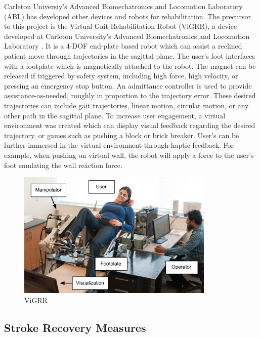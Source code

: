 \documentclass[12pt]{report}
\begin{document}
	Carleton Universiy's Advanced Biomechatronics and Locomotion Laboratory (ABL) has developed other devices and robots for rehabilitation. The precursor to this project is the Virtual Gait Rehabilitation Robot (ViGRR), a device developed at Carleton University's Advanced Biomechatronics and Locomotion Laboratory \cite{Chisholm2014, Chisholm2010}. It is a 4-DOF end-plate based robot which can assist a reclined patient move through trajectories in the sagittal plane. The user's foot interfaces with a footplate which is magnetically attached to the robot. The magnet can be released if triggered by safety system, including high force, high velocity, or pressing an emergency stop button. An admittance controller is used to provide assistance-as-needed, roughly in proportion to the trajectory error. These desired trajectories can include gait trajectories, linear motion, circular motion, or any other path in the sagittal plane. To increase user engagement, a virtual environment was created which can display visual feedback regarding the desired trajectory, or games such as pushing a block or brick breaker. User's can be further immersed in the virtual environment through haptic feedback. For example, when pushing on virtual wall, the robot will apply a force to the user's foot emulating the wall reaction force. 
	
	
	\begin{figure}[t] 
		\centering
		\includegraphics[width=0.75\linewidth]{Vigrr}
		\caption{ViGRR}
		\label{fig:vigrr}
	\end{figure}	
	
	

	\subsection{Stroke Recovery Measures}
	
\end{document}
